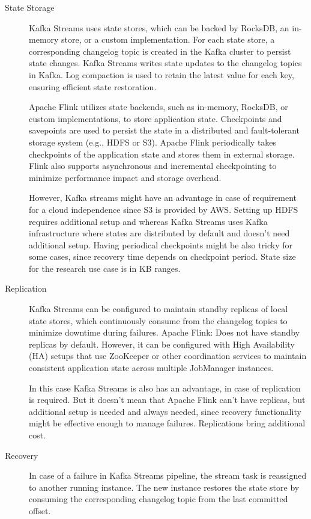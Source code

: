 \begin{description}
    \item[State Storage]
    Kafka Streams uses state stores, which can be backed by RocksDB,
    an in-memory store, or a custom implementation.
    For each state store, a corresponding changelog topic is created
    in the Kafka cluster to persist state changes.
    Kafka Streams writes state updates to the changelog topics in Kafka.
    Log compaction is used to retain the latest value for each key,
    ensuring efficient state restoration.

    Apache Flink utilizes state backends, such as in-memory,
    RocksDB, or custom implementations, to store application state.
    Checkpoints and savepoints are used to persist the state
    in a distributed and fault-tolerant storage system (e.g., HDFS or S3).
    Apache Flink periodically takes checkpoints of the application state
    and stores them in external storage.
    Flink also supports asynchronous and incremental checkpointing to
    minimize performance impact and storage overhead.

    However, Kafka streams might have an advantage in case of requirement for
    a cloud independence since S3 is provided by AWS.
    Setting up HDFS requires additional setup and whereas Kafka Streams
    uses Kafka infrastructure where states are distributed by default and
    doesn't need additional setup.
    Having periodical checkpoints might be also tricky for some cases, since recovery time
    depends on checkpoint period.
    State size for the research use case is in KB ranges.
    \newpage
    \item[Replication]
    Kafka Streams can be configured to maintain standby replicas of local state stores,
    which continuously consume from the changelog topics to minimize downtime during failures.
    Apache Flink: Does not have standby replicas by default.
    However, it can be configured with High Availability (HA) setups that use ZooKeeper
    or other coordination services to maintain consistent application state
    across multiple JobManager instances.

    In this case Kafka Streams is also has an advantage, in case of replication is required.
    But it doesn't mean that Apache Flink can't have replicas, but additional setup is needed
    and always needed, since recovery functionality might be effective enough to manage
    failures.
    Replications bring additional cost.

    \item[Recovery]
    In case of a failure in Kafka Streams pipeline, the stream task is reassigned to another running instance.
    The new instance restores the state store by consuming the corresponding changelog topic
    from the last committed offset.


\end{description}
